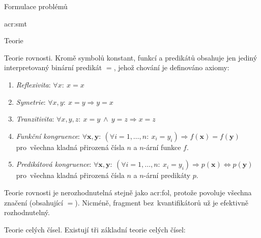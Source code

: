 \documentclass[thesis=M,czech]{FITthesis}[2012/06/26]
\newcommand{\acrlabel}[1]{acr:#1}
\newcommand{\acr}[1]{\acrshort{\acrlabel{#1}}}
\newcommand{\acrf}[1]{\acrfull{\acrlabel{#1}}}
\newcommand{\hl}[1]{\textit{#1}}
\newcommand{\name}[1]{\hl{#1}}
\renewcommand{\vec}[1]{\ensuremath{\boldsymbol{#1}}}
\begin{document}
\begin{section}{Formulace problémů}
\begin{subsection}{\acrf{smt}}
\begin{subsubsection}{Teorie}
\begin{paragraph}{Teorie rovnosti.}
\label{p:theory:formulation:smt:theory:equal}
Kromě symbolů konstant, funkcí a predikátů
obsahuje jen jediný interpretovaný binární predikát $=$,
jehož chování je definováno axiomy:
\begin{enumerate}
\item \name{Reflexivita}:
   $\forall x : \: x = x$
\item \name{Symetrie}:
   $\forall x,y : \: x = y \Rightarrow y = x$
\item \name{Tranzitivita}:
   $\forall x,y,z : \: x = y \: \land \: y = z \Rightarrow x = z$
\item \name{Funkční kongruence}:
   $\forall \vec{x},\vec{y} : \:
      \left( \forall i = 1, \dots, n : \: x_i = y_i \right)
      \Rightarrow f(\vec{x}) = f(\vec{y})$ \\
   pro~všechna kladná přirozená čísla $n$ a $n$-ární funkce $f$.
\item \name{Predikátová kongruence}:
   $\forall \vec{x},\vec{y} : \:
      \left( \forall i = 1, \dots, n : \: x_i = y_i \right)
      \Rightarrow p(\vec{x}) \Leftrightarrow p(\vec{y})$ \\
   pro~všechna kladná přirozená čísla $n$ a $n$-ární predikáty $p$.
\end{enumerate}

Teorie rovnosti je nerozhodnutelná stejně jako \acr{fol},
protože povoluje všechna značení (obsahující $=$).
Nicméně, fragment bez~kvantifikátorů
už je efektivně rozhodnutelný.
\end{paragraph} %


\begin{paragraph}{Teorie celých čísel.}
\label{p:theory:formulation:smt:theory:int}
Existují tři základní teorie celých čísel:


\end{paragraph}
\end{subsubsection}
\end{subsection}
\end{section}
\end{document}
